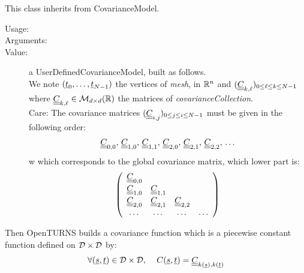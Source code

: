 This class inherits from CovarianceModel.\\

\begin{description}

\item[Usage:] \rule{0pt}{1em}
\bigskip

\item[Arguments:]  \rule{0pt}{1em}
\bigskip

\item[Value:] a UserDefinedCovarianceModel, built as follows. \\
We note $({\underline{t}}_0,\dots, {\underline{t}}_{N-1})$ the vertices of \textit{mesh}, in ${\mathbb R}^n$ and $({\underline{\underline{C}}}_{k,\ell})_{0 \leq \ell \leq k \leq N-1}$ where ${\underline{\underline{C}}}_{k,\ell} \in \mathcal{M}_{d \times d}({\mathbb R})$ the matrices of \textit{covarianceCollection}.\\
Care: The covariance matrices $({\underline{\underline{C}}}_{i,j})_{0 \leq j \leq i \leq N-1}$ must be given in the following order:
\begin{align*}
{\underline{\underline{C}}}_{0,0}, \, {\underline{\underline{C}}}_{1, 0}, \, {\underline{\underline{C}}}_{1,1}, \, {\underline{\underline{C}}}_{2,0},  \,{\underline{\underline{C}}}_{2,1},\, {\underline{\underline{C}}}_{2,2}, \,\dots
\end{align*}w
which corresponds to the global covariance matrix, which lower part is:
\begin{align*}
\left(
\begin{array}{cccc}
{\underline{\underline{C}}}_{0,0}& & & \\
{\underline{\underline{C}}}_{1,0}&  {\underline{\underline{C}}}_{1,1}& & \\
{\underline{\underline{C}}}_{2,0}&   {\underline{\underline{C}}}_{2,1}& {\underline{\underline{C}}}_{2,2}& \\
\dots & \dots & \dots & \dots
\end{array}
\right)
\end{align*}
\end{description}
Then OpenTURNS builds a covariance function which is a  piecewise constant function defined on ${\mathcal D} \times {\mathcal D}$ by:
\begin{align*}
\forall ({\underline{s}}, {\underline{t}}) \in {\mathcal D} \times {\mathcal D}, \, \quad C({\underline{s}}, {\underline{t}}) =  {\underline{\underline{C}}}_{k({\underline{s}}),k({\underline{t}})}
\end{align*}
